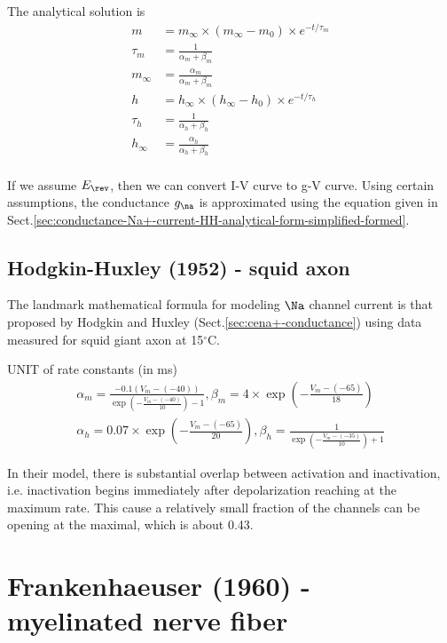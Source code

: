 The analytical solution is
\begin{equation}
\begin{split}
m  &= m_\infty \times (m_\infty - m_0) \times e^{-t/\tau_m}  \\
\tau_m &= \frac{1}{\alpha_m + \beta_m} \\
m_\infty &= \frac{\alpha_m}{\alpha_m + \beta_m} \\
h  &= h_\infty \times (h_\infty - h_0) \times e^{-t/\tau_h}  \\
\tau_h &= \frac{1}{\alpha_h + \beta_h} \\
h_\infty &= \frac{\alpha_h}{\alpha_h + \beta_h} \\
\end{split}
\end{equation}

If we assume $E_\rev$, then we can convert I-V curve to g-V curve. 
Using certain assumptions, the conductance $g_\na$ is approximated using the
equation given in
Sect.\ref{sec:conductance-Na+-current-HH-analytical-form-simplified-formed}.


\subsection{Hodgkin-Huxley (1952) - squid axon}
\label{sec:Ina_Hodgkin-Huxley}

The landmark mathematical formula for modeling $\Na$ channel current is that
proposed by Hodgkin and Huxley (Sect.\ref{sec:cena+-conductance}) using data
measured for squid giant axon  at 15$^\circ$C.

UNIT of rate constants (in ms) 
\begin{equation}
\begin{split}
      \alpha_m = \frac{-0.1(V_m - (-40))}{\exp(-\frac{V_m - (-40)}{10})-1} ,
      \beta_m = 4 \times \exp(-\frac{V_m - (-65)}{18})
      \\
          \alpha_h = 0.07\times \exp (-\frac{V_m - (-65)}{20})  ,
      \beta_h = \frac{1}{\exp(-\frac{V_m - (-35)}{10}) + 1}
\end{split}
\end{equation}

In their model, there is substantial overlap between activation and
inactivation, i.e. inactivation begins immediately after depolarization reaching
at the maximum rate. This cause a relatively small fraction of the channels can
be opening at the maximal, which is about 0.43.

\section{Frankenhaeuser (1960) - myelinated nerve fiber}
\label{sec:Ina_Frankenhaeuser-1960}

